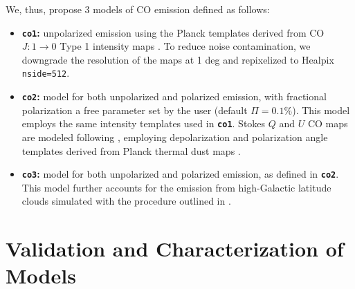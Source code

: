 \documentclass[twocolumn]{aastex631}
\begin{document}
 We, thus,  propose  3  models of CO emission defined as follows: 
\begin{itemize}
    \item {\bf\texttt{co1}:} unpolarized emission using  the Planck templates derived from  CO $J:1\rightarrow0$ Type 1 intensity   maps \citep{planck2013-p03a}. To reduce noise contamination, we downgrade the resolution of the maps at 1 deg and repixelized to Healpix \texttt{nside=512}. 
      \item {\bf\texttt{co2}:} model for both unpolarized and polarized emission, with fractional polarization a free parameter set by the user (default $\Pi = 0.1 \%$). This model employs the same intensity templates used in  {\bf\texttt{co1}}.  Stokes $Q$ and $U$ CO maps are modeled following \citet[eqs. (12) and (13) of]{Puglisi:2017}, employing  depolarization  and polarization angle  templates derived from   Planck thermal dust maps \citep{planck2014-a12}. 
        \item {\bf\texttt{co3}:}  model for both unpolarized and polarized emission, as defined in {\bf\texttt{co2}}. This model further accounts for the emission from high-Galactic latitude clouds simulated with the procedure outlined in \citet{Puglisi:2017}.
\end{itemize}
 


\section{Validation and Characterization of Models} \label{sec:validation}
\end{document}

